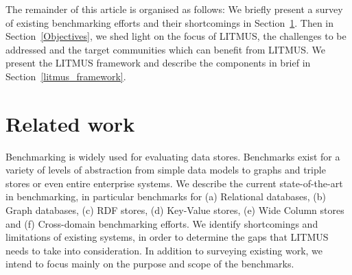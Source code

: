 \documentclass{llncs}
\begin{document}
    
The remainder of this article is organised as follows: 
We briefly present a survey of existing benchmarking efforts and their shortcomings in Section~\ref{relwork}. 
Then in Section~\ref{Objectives}, we shed light on the focus of LITMUS, the challenges to be addressed and the target communities which can benefit from LITMUS. 
We present the LITMUS framework and describe the components in brief in Section~\ref{litmus_framework}.  



\section{Related work}\label{relwork}

Benchmarking is widely used for evaluating data stores. 
Benchmarks exist for a variety of levels of abstraction from simple data models to graphs and triple stores or even entire enterprise systems.
We describe the current state-of-the-art in benchmarking, in particular benchmarks for (a) Relational databases, (b) Graph databases, (c) RDF stores, (d) Key-Value stores, (e) Wide Column stores and (f) Cross-domain benchmarking efforts.
We identify shortcomings and limitations of existing systems, in order to determine the gaps that LITMUS needs to take into consideration.
In addition to surveying existing work, we intend to focus mainly on the purpose and scope of the benchmarks.
    
\end{document}
